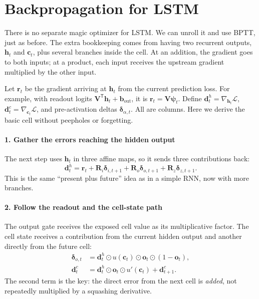 \documentclass[11pt, oneside]{book}
\newcommand{\T}{^{\mathsf{T}}}           %
\newcommand{\loss}{\mathcal{L}}          %
\newcommand{\params}{\boldsymbol{\theta}}   %
\let\originalsection\section
\renewcommand{\section}{\Needspace{7\baselineskip}\originalsection}
\begin{document}
\section{Backpropagation for LSTM}\label{sec:source-3-1}
There is no separate magic optimizer for LSTM. We can unroll it and use BPTT, just as before. The extra bookkeeping comes from having two recurrent outputs, $\mathbf{h}_t$ and $\mathbf{c}_t$, plus several branches inside the cell. At an addition, the gradient goes to both inputs; at a product, each input receives the upstream gradient multiplied by the other input.

Let $\mathbf{r}_t$ be the gradient arriving at $\mathbf{h}_t$ from the current prediction loss. For example, with readout logits $\mathbf{V}\T\mathbf{h}_t+\mathbf{b}_{\mathrm{out}}$, it is $\mathbf{r}_t=\mathbf{V}\boldsymbol{\psi}_t$. Define $\mathbf{d}^h_t=\nabla_{\mathbf{h}_t}\loss$, $\mathbf{d}^c_t=\nabla_{\mathbf{c}_t}\loss$, and pre-activation deltas $\boldsymbol{\delta}_{\alpha,t}$. All are columns. Here we derive the basic cell without peepholes or forgetting.

\paragraph{1. Gather the errors reaching the hidden output} The next step uses $\mathbf{h}_t$ in three affine maps, so it sends three contributions back:
\[
 \mathbf{d}^h_t=\mathbf{r}_t+
   \mathbf{R}_i\boldsymbol{\delta}_{i,t+1}
  +\mathbf{R}_o\boldsymbol{\delta}_{o,t+1}
  +\mathbf{R}_z\boldsymbol{\delta}_{z,t+1}.
\]
This is the same ``present plus future'' idea as in a simple RNN, now with more branches.

\paragraph{2. Follow the readout and the cell-state path} The output gate receives the exposed cell value as its multiplicative factor. The cell state receives a contribution from the current hidden output and another directly from the future cell:
\begin{align}
 \boldsymbol{\delta}_{o,t}
   &=\mathbf{d}^h_t\odot u(\mathbf{c}_t)
        \odot\mathbf{o}_t\odot(1-\mathbf{o}_t),\\
 \mathbf{d}^c_t
   &=\mathbf{d}^h_t\odot\mathbf{o}_t\odot u'(\mathbf{c}_t)
       +\mathbf{d}^c_{t+1}.\label{eq:lstm-dc-basic}
\end{align}
The second term is the key: the direct error from the next cell is \emph{added}, not repeatedly multiplied by a squashing derivative.
\end{document}
